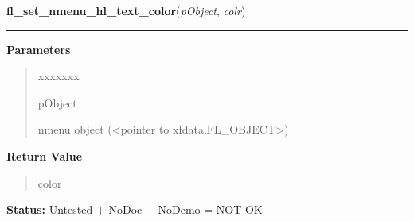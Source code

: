 \hspace{.8\funcindent}\begin{boxedminipage}{\funcwidth}

    \raggedright \textbf{fl\_set\_nmenu\_hl\_text\_color}(\textit{pObject}, \textit{colr})

    \vspace{-1.5ex}

    \rule{\textwidth}{0.5\fboxrule}
\setlength{\parskip}{2ex}
\setlength{\parskip}{1ex}
      \textbf{Parameters}
      \vspace{-1ex}

      \begin{quote}
        \begin{Ventry}{xxxxxxx}

          \item[pObject]

          nmenu object ({\textless}pointer to 
          xfdata.FL\_OBJECT{\textgreater})

        \end{Ventry}

      \end{quote}

      \textbf{Return Value}
    \vspace{-1ex}

      \begin{quote}
      color

      \end{quote}

\textbf{Status:} Untested + NoDoc + NoDemo = NOT OK



    \end{boxedminipage}

    \label{xformslib:library:fl_add_positioner}

    \vspace{0.5ex}

